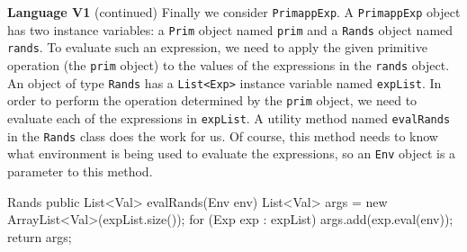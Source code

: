 \begin{minipage}[t]{\sw}
\slidenumber
\LARGE
{\bf Language V1} (continued)\exx
Finally we consider \verb'PrimappExp'.
A \verb'PrimappExp' object has two instance variables:
a \verb'Prim' object named \verb'prim'
and a \verb'Rands' object named \verb'rands'.
To evaluate such an expression,
we need to apply the given primitive operation
(the \verb'prim' object)
to the values of the expressions in the \verb'rands' object.\exx
An object of type \verb'Rands' has
a \verb'List<Exp>' instance variable named \verb'expList'.
In order to perform the operation determined by the \verb'prim' object,
we need to evaluate each of the expressions in \verb'expList'.
A utility method named \verb'evalRands' in the \verb'Rands' class
does the work for us.
Of course, this method needs to know what environment is being used
to evaluate the expressions,
so an \verb'Env' object is a parameter to this method.
{\Large
\begin{qv}
Rands
    public List<Val> evalRands(Env env) {
        List<Val> args = new ArrayList<Val>(expList.size());
        for (Exp exp : expList)
            args.add(exp.eval(env));
        return args;
    }
\end{qv}
}
\end{minipage}
\clearpage
